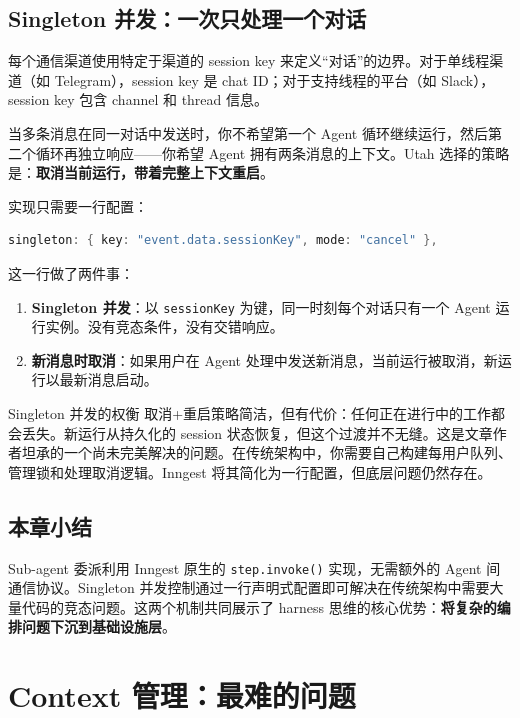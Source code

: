 \documentclass[a4paper]{article}
\begin{document}
\subsection{Singleton 并发：一次只处理一个对话}

每个通信渠道使用特定于渠道的 session key 来定义``对话''的边界。对于单线程渠道（如 Telegram），session key 是 chat ID；对于支持线程的平台（如 Slack），session key 包含 channel 和 thread 信息。

当多条消息在同一对话中发送时，你不希望第一个 Agent 循环继续运行，然后第二个循环再独立响应——你希望 Agent 拥有两条消息的上下文。Utah 选择的策略是：\textbf{取消当前运行，带着完整上下文重启}。

实现只需要一行配置：

\begin{lstlisting}[caption={Singleton 并发配置},language=Java]
singleton: { key: "event.data.sessionKey", mode: "cancel" },
\end{lstlisting}

这一行做了两件事：

\begin{enumerate}
    \item \textbf{Singleton 并发}：以 \texttt{sessionKey} 为键，同一时刻每个对话只有一个 Agent 运行实例。没有竞态条件，没有交错响应。
    \item \textbf{新消息时取消}：如果用户在 Agent 处理中发送新消息，当前运行被取消，新运行以最新消息启动。
\end{enumerate}

\begin{warningbox}{Singleton 并发的权衡}
取消+重启策略简洁，但有代价：任何正在进行中的工作都会丢失。新运行从持久化的 session 状态恢复，但这个过渡并不无缝。这是文章作者坦承的一个尚未完美解决的问题。在传统架构中，你需要自己构建每用户队列、管理锁和处理取消逻辑。Inngest 将其简化为一行配置，但底层问题仍然存在。
\end{warningbox}

\subsection{本章小结}

Sub-agent 委派利用 Inngest 原生的 \texttt{step.invoke()} 实现，无需额外的 Agent 间通信协议。Singleton 并发控制通过一行声明式配置即可解决在传统架构中需要大量代码的竞态问题。这两个机制共同展示了 harness 思维的核心优势：\textbf{将复杂的编排问题下沉到基础设施层}。


\section{Context 管理：最难的问题}
\end{document}
